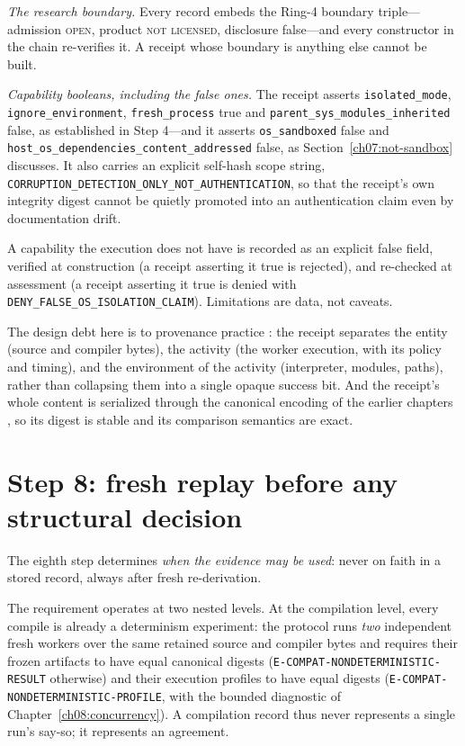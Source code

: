 \emph{The research boundary.} Every record embeds the Ring-4 boundary triple---admission \textsc{open}, product \textsc{not licensed}, disclosure false---and every constructor in the chain re-verifies it. A receipt whose boundary is anything else cannot be built.

\emph{Capability booleans, including the false ones.} The receipt asserts \texttt{isolated\_mode}, \texttt{ignore\_environment}, \texttt{fresh\_process} true and \texttt{parent\_sys\_modules\_inherited} false, as established in Step 4---and it asserts \texttt{os\_sandboxed} false and \texttt{host\_os\_dependencies\_content\_addressed} false, as Section~\ref{ch07:not-sandbox} discusses. It also carries an explicit self-hash scope string, \texttt{CORRUPTION\_DETECTION\_ONLY\_NOT\_AUTHENTICATION}, so that the receipt's own integrity digest cannot be quietly promoted into an authentication claim even by documentation drift.

\begin{ruleenv}\label{ch07:rule:weakness-fields}
A capability the execution does not have is recorded as an explicit false field, verified at construction (a receipt asserting it true is rejected), and re-checked at assessment (a receipt asserting it true is denied with \texttt{DENY\_FALSE\_OS\_ISOLATION\_CLAIM}). Limitations are data, not caveats.
\end{ruleenv}

The design debt here is to provenance practice \cite{prov}: the receipt separates the entity (source and compiler bytes), the activity (the worker execution, with its policy and timing), and the environment of the activity (interpreter, modules, paths), rather than collapsing them into a single opaque success bit. And the receipt's whole content is serialized through the canonical encoding of the earlier chapters \cite{jcs}, so its digest is stable and its comparison semantics are exact.

\section{Step 8: fresh replay before any structural decision}\label{ch07:step8}

The eighth step determines \emph{when the evidence may be used}: never on faith in a stored record, always after fresh re-derivation.

The requirement operates at two nested levels. At the compilation level, every compile is already a determinism experiment: the protocol runs \emph{two} independent fresh workers over the same retained source and compiler bytes and requires their frozen artifacts to have equal canonical digests (\texttt{E-COMPAT-NONDETERMINISTIC-RESULT} otherwise) and their execution profiles to have equal digests (\texttt{E-COMPAT-NONDETERMINISTIC-PROFILE}, with the bounded diagnostic of Chapter~\ref{ch08:concurrency}). A compilation record thus never represents a single run's say-so; it represents an agreement.

